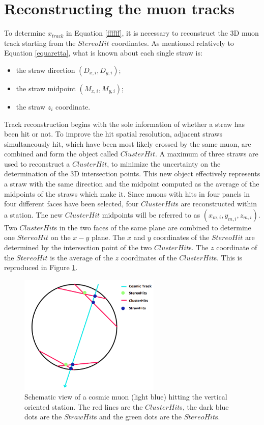 \section{Reconstructing the muon tracks}\label{reconstruction}
To determine $x_{track}$ in Equation \ref{ffffff}, 
it is necessary to reconstruct the 3D muon track 
starting from the $StereoHit$ coordinates.
As mentioned relatively to Equation \ref{equaretta}, 
what is known about each single straw is:
\begin{itemize}
    \item the straw direction $(D_{x,i},D_{y,i})$;
    \item the straw midpoint $(M_{x,i},M_{y,i})$;
    \item the straw $z_i$ coordinate.
\end{itemize} 
Track reconstruction begins 
with the sole information of whether 
a straw has been hit or not.
To improve the hit spatial resolution, adjacent 
straws simultaneously hit, which have been most 
likely crossed by the same muon, are combined 
and form the object called $ClusterHit$. 
A maximum of three straws are used to reconstruct a 
$ClusterHit$, to minimize the uncertainty on 
the determination of the 3D intersection points.
This new object effectively represents a 
straw with the same direction and the midpoint 
computed as the average of the midpoints of the straws  
which make it. Since muons with hits in four panels in four different 
faces have been selected, four $ClusterHit$s are reconstructed 
within a station. The new $ClusterHit$ 
midpoints will be referred to as 
$(x_{m,i}, y_{m,i}, z_{m,i})$.
Two $ClusterHit$s in the two faces of the same 
plane are combined to determine one $StereoHit$ on 
the $x-y$ plane. 
The $x$ and $y$ coordinates of the 
$StereoHit$ are determined by the 
intersection point of the two 
$ClusterHit$s. The $z$ coordinate of 
the $StereoHit$ is the average of the 
$z$ coordinates of the $ClusterHit$s.
This is reproduced in Figure \ref{fig:stco}.
\begin{figure}[!h]
    \centering
    \includegraphics[width =0.6\textwidth]{figures/png/Screenshot_20240810_210144.png}
    \caption[Schematic view of a cosmic muon hitting the vertical oriented station.]{Schematic view of a cosmic muon (light blue) hitting the vertical oriented station. The red lines are the $ClusterHit$s, the dark blue dots 
    are the $StrawHit$s and the green dots are the $StereoHit$s.}
    \label{fig:stco}
\end{figure}
